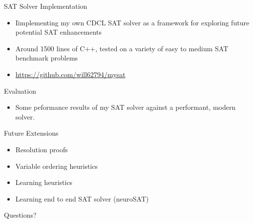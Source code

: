 \documentclass{beamer}
\begin{document}
\begin{frame}{SAT Solver Implementation}
    \begin{itemize}
        \item Iimplementing my own CDCL SAT solver as a framework for exploring future potential SAT enhancements
        \item Around 1500 lines of C++, tested on a variety of easy to medium SAT benchmark problems
        \item \url{https://github.com/will62794/mysat}
    \end{itemize}
\end{frame}

\begin{frame}{Evaluation}
    \begin{itemize}
        \item Some peformance results of my SAT solver against a performant, modern solver.
    \end{itemize}
\end{frame}

\begin{frame}{Future Extensions}
    \begin{itemize}
        \item Resolution proofs
        \item Variable ordering heuristics
        \item Learning heuristics
        \item Learning end to end SAT solver (neuroSAT)
    \end{itemize}
\end{frame}

\begin{frame}{}
    \begin{center}
        \large
        Questions?
    \end{center}
\end{frame}



\end{document}

